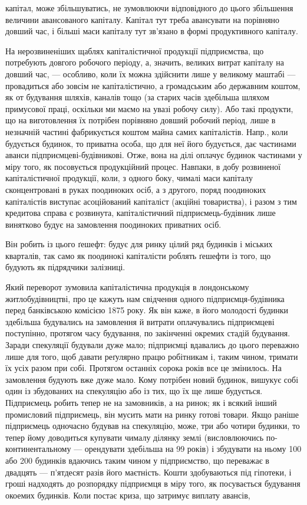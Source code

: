 \parcont{}  %
капітал, може збільшуватись, не зумовлюючи відповідного до цього збільшення
величини авансованого капіталу. Капітал тут треба авансувати на
порівняно довший час, і більші маси капіталу тут зв’язано в формі продуктивного
капіталу.

На нерозвиненіших щаблях капіталістичної продукції підприємства,
що потребують довгого робочого періоду, а, значить, великих витрат капіталу
на довший час, — особливо, коли їх можна здійснити лише у великому
маштабі — провадиться або зовсім не капіталістично, а громадським
або державним коштом, як от будування шляхів, каналів тощо (за старих
часів здебільша шляхом примусової праці, оскільки ми маємо
на увазі робочу силу). Або такі продукти, що на виготовлення їх потрібен
порівняно довший робочий період, лише в незначній частині фабрикується
коштом майна самих капіталістів. Напр., коли будується будинок,
то приватна особа, що для неї його будується, дає частинами аванси
підприємцеві-будівникові. Отже, вона на ділі оплачує будинок частинами
у міру того, як посовується продукційний процес. Навпаки, в добу розвиненої
капіталістичної продукції, коли, з одного боку, чималі маси капіталу
сконцентровані в руках поодиноких осіб, а з другого, поряд поодиноких
капіталістів виступає асоційований капіталіст (акційні товариства),
і разом з тим кредитова справа є розвинута, капіталістичний
підприємець-будівник лише винятково будує на замовлення поодиноких
приватних осіб.

Він робить із цього ґешефт: будує для ринку цілий ряд будинків і
міських кварталів, так само як поодинокі капіталісти роблять ґешефти
із того, що будують як підрядчики залізниці.

Який переворот зумовила капіталістична продукція в лондонському
житлобудівництві, про це кажуть нам свідчення одного підприємця-будівника
перед банківською комісією 1875 року. Як він каже, в його
молодості будинки здебільша будувались на замовлення й витрати оплачувались
підприємцеві поступінно, протягом часу будування, по закінченні
окремих стадій будування. Заради спекуляції будували дуже мало;
підприємці вдавались до цього переважно лише для того, щоб давати
реґулярно працю робітникам і, таким чином, тримати їх усіх разом при
собі. Протягом останніх сорока років все це змінилось. На замовлення
будують вже дуже мало. Кому потрібен новий будинок, вишукує
собі один із збудованих на спекуляцію або із тих, що їх ще лише будується.
Підприємець робить тепер не на замовників, а на ринок; як і
всякий інший промисловий підприємець, він мусить мати на ринку
готові товари. Якщо раніше підприємець одночасно будував на спекуляцію,
може, три або чотири будинки, то тепер йому доводиться купувати
чималу ділянку землі (висловлюючись по-континентальному — орендувати
здебільша на 99 років) і збудувати на ньому 100 або 200 будинків
вдаючись таким чином у підприємство, що переважає в двадцять — п’ятдесят
разів його маєтність. Кошти здобуваються під гіпотеки, і гроші
надходять до розпорядку підприємця в міру того, як посувається будування
окоемих будинків. Коли постає криза, що затримує виплату авансів,
\parbreak{}  %
